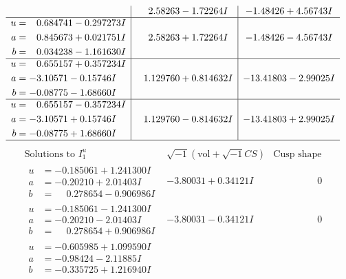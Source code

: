 \documentclass[1p]{elsarticle_modified}
\theoremstyle{definition}
\newcommand{\I}{\sqrt{-1}}
\begin{document}
$$\begin{array}{c|c|c}
 & \phantom{-}2.58263 - 1.72264 I & -1.48426 + 4.56743 I \\ \hline\begin{aligned}
u &= \phantom{-}0.684741 - 0.297273 I \\
a &= \phantom{-}0.845673 + 0.021751 I \\
b &= \phantom{-}0.034238 - 1.161630 I\end{aligned}
 & \phantom{-}2.58263 + 1.72264 I & -1.48426 - 4.56743 I \\ \hline\begin{aligned}
u &= \phantom{-}0.655157 + 0.357234 I \\
a &= -3.10571 - 0.15746 I \\
b &= -0.08775 - 1.68660 I\end{aligned}
 & \phantom{-}1.129760 + 0.814632 I & -13.41803 - 2.99025 I \\ \hline\begin{aligned}
u &= \phantom{-}0.655157 - 0.357234 I \\
a &= -3.10571 + 0.15746 I \\
b &= -0.08775 + 1.68660 I\end{aligned}
 & \phantom{-}1.129760 - 0.814632 I & -13.41803 + 2.99025 I\\
 \hline 
 \end{array}$$\newpage$$\begin{array}{c|c|c}  
\text{Solutions to }I^u_{1}& \I (\text{vol} + \sqrt{-1}CS) & \text{Cusp shape}\\
 \hline 
\begin{aligned}
u &= -0.185061 + 1.241300 I \\
a &= -0.20210 + 2.01403 I \\
b &= \phantom{-}0.278654 - 0.906986 I\end{aligned}
 & -3.80031 + 0.34121 I & \phantom{-0.000000 } 0 \\ \hline\begin{aligned}
u &= -0.185061 - 1.241300 I \\
a &= -0.20210 - 2.01403 I \\
b &= \phantom{-}0.278654 + 0.906986 I\end{aligned}
 & -3.80031 - 0.34121 I & \phantom{-0.000000 } 0 \\ \hline\begin{aligned}
u &= -0.605985 + 1.099590 I \\
a &= -0.98424 - 2.11885 I \\
b &= -0.335725 + 1.216940 I\end{aligned}

\end{array}$$
\end{document}
